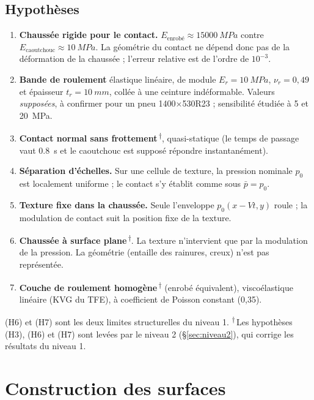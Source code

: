 \documentclass[11pt,a4paper]{article}
\begin{document}
\subsection{Hypothèses}
\begin{enumerate}[label=(H\arabic*),leftmargin=*,nosep]
\item \textbf{Chaussée rigide pour le contact.} $E_{\text{enrobé}}\approx\SI{15000}{MPa}$ contre
      $E_{\text{caoutchouc}}\approx\SI{10}{MPa}$. La géométrie du contact ne dépend donc pas de la
      déformation de la chaussée ; l'erreur relative est de l'ordre de $10^{-3}$.
\item \textbf{Bande de roulement} élastique linéaire, de module $E_r=\SI{10}{MPa}$,
      $\nu_r=0{,}49$ et épaisseur $t_r=\SI{10}{mm}$, collée à une ceinture indéformable. Valeurs
      \emph{supposées}, à confirmer pour un pneu 1400$\times$530R23 ; sensibilité étudiée à 5 et
      \SI{20}{MPa}.
\item \textbf{Contact normal sans frottement}\,\textsuperscript{$\dagger$}, quasi-statique (le temps de passage vaut
      \SI{0.8}{s} et le caoutchouc est supposé répondre instantanément).
\item \textbf{Séparation d'échelles.} Sur une cellule de texture, la pression nominale $p_0$ est
      localement uniforme ; le contact s'y établit comme sous $\bar p=p_0$.
\item \textbf{Texture fixe dans la chaussée.} Seule l'enveloppe $p_0(x-Vt,y)$ roule ; la
      modulation de contact suit la position fixe de la texture.
\item \textbf{Chaussée à surface plane}\,\textsuperscript{$\dagger$}. La texture n'intervient que par la modulation de la
      pression. La géométrie (entaille des rainures, creux) n'est pas représentée.
\item \textbf{Couche de roulement homogène}\,\textsuperscript{$\dagger$} (enrobé équivalent), viscoélastique linéaire (KVG du
      TFE), à coefficient de Poisson constant (0,35).
\end{enumerate}
(H6) et (H7) sont les deux limites structurelles du niveau 1. \textsuperscript{$\dagger$}\,Les
hypothèses (H3), (H6) et (H7) sont levées par le niveau 2 (\S\ref{sec:niveau2}), qui corrige les
résultats du niveau 1.

\section{Construction des surfaces}\label{sec:surfaces}
\end{document}
